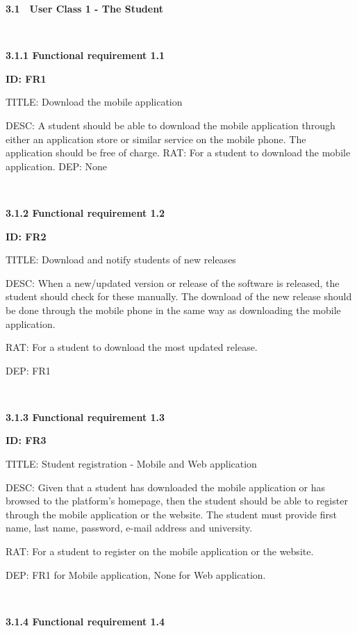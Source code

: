 \documentclass[12pt,a4paper]{article}
\begin{document}
    \begin{flushleft}

        \textbf{3.1}\ \ \textbf{User Class 1 - The Student}

        \

        \textbf{3.1.1 Functional requirement 1.1}

        \textbf{ID: FR1}

        TITLE: Download the mobile application

        DESC: A student should be able to download the mobile application
        through either an application store or similar service on the mobile
        phone. The application should be free of charge.
        RAT: For a student to download the mobile application.
        DEP: None

        \


        \textbf{3.1.2 Functional requirement 1.2}

        \textbf{ID: FR2}

        TITLE: Download and notify students of new releases

        DESC: When a new/updated version or release of the software is released,
        the student should check for these manually. The download of the new
        release should be done through the mobile phone in the same way as
        downloading the mobile application.

        RAT: For a student to download the most updated release.

        DEP: FR1

        \

        \textbf{3.1.3 Functional requirement 1.3}

        \textbf{ID: FR3}

        TITLE: Student registration - Mobile and Web application

        DESC: Given that a student has downloaded the mobile application or has
        browsed to the platform's homepage, then the student should be able to
        register through the mobile application or the website. The student must
        provide first name, last name, password, e-mail address and university.

        RAT: For a student to register on the mobile application or the website.

        DEP: FR1 for Mobile application, None for Web application.


        \
\newpage


        \textbf{3.1.4 Functional requirement 1.4}


\end{flushleft}
\end{document}
